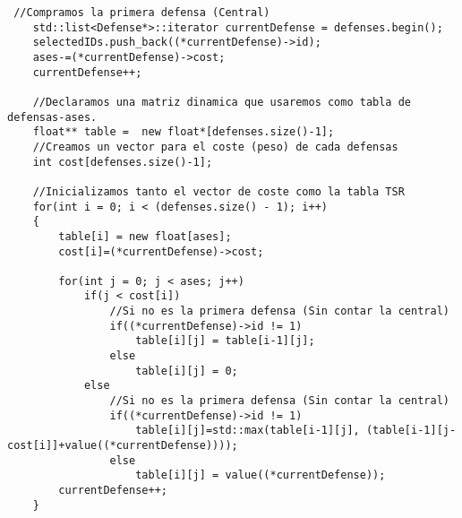 \begin{lstlisting}
 //Compramos la primera defensa (Central)
    std::list<Defense*>::iterator currentDefense = defenses.begin();
    selectedIDs.push_back((*currentDefense)->id);
    ases-=(*currentDefense)->cost;
    currentDefense++;
    
    //Declaramos una matriz dinamica que usaremos como tabla de defensas-ases.
    float** table =  new float*[defenses.size()-1];
    //Creamos un vector para el coste (peso) de cada defensas
    int cost[defenses.size()-1];

    //Inicializamos tanto el vector de coste como la tabla TSR
    for(int i = 0; i < (defenses.size() - 1); i++)
    {
        table[i] = new float[ases];
        cost[i]=(*currentDefense)->cost;
        
        for(int j = 0; j < ases; j++)
            if(j < cost[i])
                //Si no es la primera defensa (Sin contar la central)
                if((*currentDefense)->id != 1) 
                    table[i][j] = table[i-1][j];
                else
                    table[i][j] = 0;  
            else 
                //Si no es la primera defensa (Sin contar la central)   
                if((*currentDefense)->id != 1)
                    table[i][j]=std::max(table[i-1][j], (table[i-1][j-cost[i]]+value((*currentDefense))));
                else
                    table[i][j] = value((*currentDefense));
        currentDefense++;
    }
\end{lstlisting}